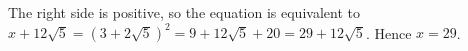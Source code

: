 The right side is positive, so the equation is equivalent to $x+12\sqrt5=\left(3+2\sqrt5\right)^2=9+12\sqrt5+20=29+12\sqrt5$. Hence $x=\boxed{29}$.
